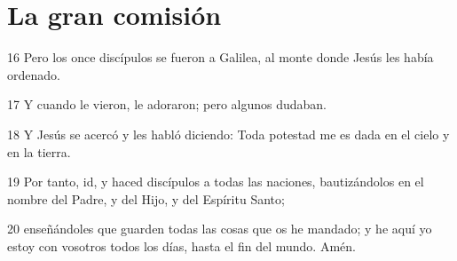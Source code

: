 \section*{La gran comisión}

\par 16 Pero los once discípulos se fueron a Galilea, al monte donde Jesús les había ordenado.
\par 17 Y cuando le vieron, le adoraron; pero algunos dudaban.
\par 18 Y Jesús se acercó y les habló diciendo: Toda potestad me es dada en el cielo y en la tierra.
\par 19 Por tanto, id, y haced discípulos a todas las naciones, bautizándolos en el nombre del Padre, y del Hijo, y del Espíritu Santo;
\par 20 enseñándoles que guarden todas las cosas que os he mandado; y he aquí yo estoy con vosotros todos los días, hasta el fin del mundo. Amén.


